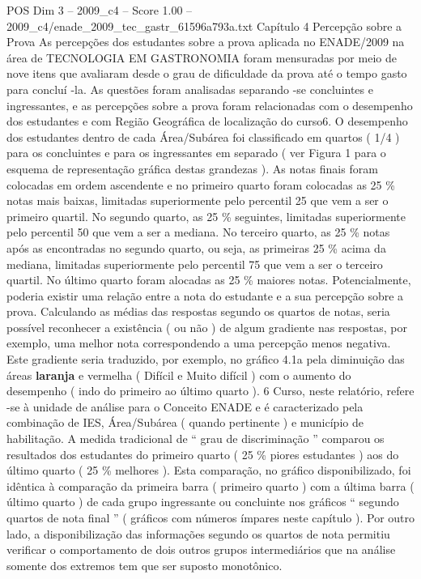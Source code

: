 \begin{textsample}{POS Dim 3 – 2009\_c4 – Score 1.00 – 2009\_c4/enade\_2009\_tec\_gastr\_61596a793a.txt}  \label{ex:f3_pos_129}
Capítulo 4 Percepção sobre a Prova As percepções dos estudantes sobre a prova aplicada no ENADE/2009 na área de TECNOLOGIA EM GASTRONOMIA foram mensuradas por meio de nove itens que avaliaram desde o grau de dificuldade da prova até o tempo gasto para concluí -la.
As questões foram analisadas separando -se concluintes e ingressantes, e as percepções sobre a prova foram relacionadas com o desempenho dos estudantes e com Região Geográfica de localização do curso6.
O desempenho dos estudantes dentro de cada Área/Subárea foi classificado em quartos ( 1/4 ) para os concluintes e para os ingressantes em separado ( ver Figura 1 para o esquema de representação gráfica destas grandezas ).
As notas finais foram colocadas em ordem ascendente e no primeiro quarto foram colocadas as 25 \% notas mais baixas, limitadas superiormente pelo percentil 25 que vem a ser o primeiro quartil.
No segundo quarto, as 25 \% seguintes, limitadas superiormente pelo percentil 50 que vem a ser a mediana.
No terceiro quarto, as 25 \% notas após as encontradas no segundo quarto, ou seja, as primeiras 25 \% acima da mediana, limitadas superiormente pelo percentil 75 que vem a ser o terceiro quartil.
No último quarto foram alocadas as 25 \% maiores notas.
Potencialmente, poderia existir uma relação entre a nota do estudante e a sua percepção sobre a prova.
Calculando as médias das respostas segundo os quartos de notas, seria possível reconhecer a existência ( ou não ) de algum gradiente nas respostas, por exemplo, uma melhor nota correspondendo a uma percepção menos negativa.
Este gradiente seria traduzido, por exemplo, no gráfico 4.1a pela diminuição das áreas \textbf{laranja} e vermelha ( Difícil e Muito difícil ) com o aumento do desempenho ( indo do primeiro ao último quarto ). 6 Curso, neste relatório, refere -se à unidade de análise para o Conceito ENADE e é caracterizado pela combinação de IES, Área/Subárea ( quando pertinente ) e município de habilitação.
A medida tradicional de “ grau de discriminação ” comparou os resultados dos estudantes do primeiro quarto ( 25 \% piores estudantes ) aos do último quarto ( 25 \% melhores ).
Esta comparação, no gráfico disponibilizado, foi idêntica à comparação da primeira barra ( primeiro quarto ) com a última barra ( último quarto ) de cada grupo ingressante ou concluinte nos gráficos “ segundo quartos de nota final ” ( gráficos com números ímpares neste capítulo ).
Por outro lado, a disponibilização das informações segundo os quartos de nota permitiu verificar o comportamento de dois outros grupos intermediários que na análise somente dos extremos tem que ser suposto monotônico.

\end{textsample}
